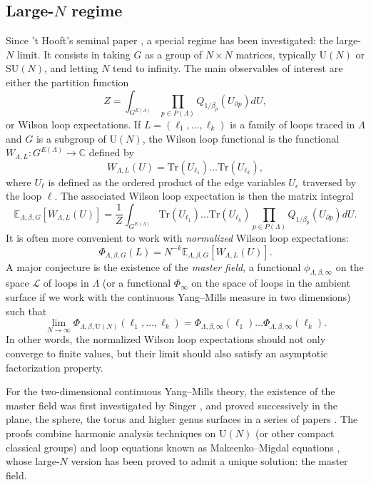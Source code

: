\documentclass[11pt,a4paper,reqno]{amsart}
\theoremstyle{definition}
\theoremstyle{remark}
\newcommand\U{{\mathrm U}}
\newcommand\SU{{\mathrm {SU}}}
\newcommand\C{{\mathbb C}}
\newcommand\E{{\mathbb E}}
\newcommand\Tr{{\mathrm{Tr}}}
\begin{document}
\subsection{Large-$N$ regime}

Since 't Hooft's seminal paper \cite{Hoo74}, a special regime has been investigated: the large-$N$ limit. It consists in taking $G$ as a group of $N\times N$ matrices, typically $\U(N)$ or $\SU(N)$, and letting $N$ tend to infinity. The main observables of interest are either the partition function
\[
Z=\int_{G^{E(\Lambda)}}\prod_{p\in P(\Lambda)}Q_{1/\beta_p}(U_{\partial p}) dU,
\]
or Wilson loop expectations. If $L=(\ell_1,\ldots,\ell_k)$ is a family of loops traced in $\Lambda$ and $G$ is a subgroup of $\U(N)$, the Wilson loop functional is the functional $W_{\Lambda,L}:G^{E(\Lambda)}\to\C$ defined by
\[
W_{\Lambda,L}(U)=\Tr(U_{\ell_1})\ldots\Tr(U_{\ell_k}),
\]
where $U_\ell$ is defined as the ordered product of the edge variables $U_e$ traversed by the loop $\ell$. The associated Wilson loop expectation is then the matrix integral
\[
\E_{\Lambda,\beta,G}[W_{\Lambda,L}(U)]=\frac1Z\int_{G^{E(\Lambda)}}\Tr(U_{\ell_1})\ldots\Tr(U_{\ell_k})\prod_{p\in P(\Lambda)}Q_{1/\beta_p}(U_{\partial p})dU.
\]
It is often more convenient to work with \emph{normalized} Wilson loop expectations:
\[
\Phi_{\Lambda,\beta,G}(L)=N^{-k}\E_{\Lambda,\beta,G}[W_{\Lambda,L}(U)].
\]
A major conjecture is the existence of the \emph{master field}, a functional $\phi_{\Lambda,\beta,\infty}$ on the space $\mathcal{L}$ of loops in $\Lambda$ (or a functional $\Phi_\infty$ on the space of loops in the ambient surface if we work with the continuous Yang--Mills measure in two dimensions) such that
\[
\lim_{N\to\infty}\Phi_{\Lambda,\beta,\U(N)}(\ell_1,\ldots,\ell_k)=\Phi_{\Lambda,\beta,\infty}(\ell_1)\ldots\Phi_{\Lambda,\beta,\infty}(\ell_k).
\]
In other words, the normalized Wilson loop expectations should not only converge to finite values, but their limit should also satisfy an asymptotic factorization property.

For the two-dimensional continuous Yang--Mills theory, the existence of the master field was first investigated by Singer \cite{Sing95}, and proved successively in the plane, the sphere, the torus and higher genus surfaces in a series of papers \cite{Lev17,DN,DL23,DL25,PPSY23,Dah26}. The proofs combine harmonic analysis techniques on $\U(N)$ (or other compact classical groups) and loop equations known as Makeenko--Migdal equations \cite{MM79}, whose large-$N$ version has been proved to admit a unique solution: the master field.
\end{document}

